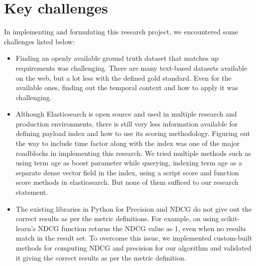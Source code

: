 \section{Key challenges}
In implementing and formulating this research project, we encountered some challenges listed below:
\begin{itemize}
    \item Finding an openly available ground truth dataset that matches up requirements was challenging. There are many text-based datasets available on the web, but a lot less with the defined gold standard. Even for the available ones, finding out the temporal context and how to apply it was challenging.
    \item Although Elasticsearch is open source and used in multiple research and production environments, there is still very less information available for defining payload index and how to use its scoring methodology. Figuring out the way to include time factor along with the index was one of the major roadblocks in implementing this research. We tried multiple methods such as using term age as boost parameter while querying, indexing term age as a separate dense vector field in the index, using a script score and function score methods in elasticsearch.  But none of them sufficed to our research statement.
    \item The existing libraries in Python for Precision and NDCG do not give out the correct results as per the metric definitions. For example, on using scikit-learn's NDCG function returns the NDCG value as 1, even when no results match in the result set. To overcome this issue, we implemented custom-built methods for computing NDCG and precision for our algorithm and validated it giving the correct results as per the metric definition.
    
    
\end{itemize}
